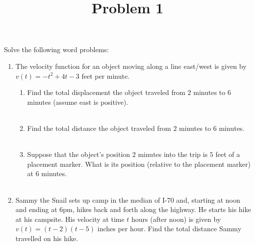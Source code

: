 \documentclass{ximera}
\title[Problem 1]{Problem 1}
\begin{document}
\begin{abstract} \end{abstract}
\maketitle

\begin{problem}

Solve the following word problems:

	\begin{enumerate}

	\item  The velocity function for an object moving along a line east/west is given by
		$v(t) = -t^2 + 4t - 3$ feet per minute.

		\begin{enumerate}

			\item Find the total displacement the object traveled 
				from $2$ minutes to $6$ minutes (assume east is positive).\\ \\

			\item Find the total distance the object traveled from $2$ minutes to 
				$6$ minutes.\\ \\
			
			\item  Suppose that the object's position $2$ minutes into the trip is 
				$5$ feet of a placement marker.  What is its position (relative to the placement marker) at $6$ minutes.\\ \\
			\end{enumerate}
			
			\item  Sammy the Snail sets up camp in the median of I-70 and, starting at noon and ending at 6pm, hikes back and forth along the highway.  He starts his hike at his campsite.  His velocity at time $t$ hours (after noon)  is given by $v(t)=(t-2)(t-5)$ inches per hour.  Find the total distance Sammy travelled on his hike.\\ \\
		\end{enumerate}

\end{problem}
\end{document}
